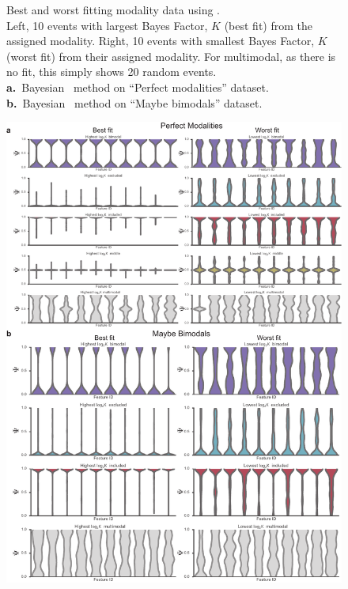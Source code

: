 \clearpage
\thispagestyle{facingcaption}
\begin{figure}[h]
\captionsetup{labelformat=prev-page}
  \caption[Best and worst fitting modality data using \anchor.]{
  Best and worst fitting modality data using \anchor.\\
Left, 10 events with largest Bayes Factor, $K$ (best fit) from the assigned modality. Right, 10 events with smallest Bayes Factor, $K$ (worst fit) from their assigned modality. For multimodal, as there is no fit, this simply shows 20 random events.\\
\textbf{a.}~Bayesian \anchor\, method on ``Perfect modalities'' dataset.\\
\textbf{b.}~Bayesian \anchor\, method on ``Maybe bimodals'' dataset.
}
\label{fig:anchor_best_worst}
\end{figure}
\clearpage
\begin{figure}[h]
\ContinuedFloat
\captionsetup{labelformat=empty}
\centering
  \includegraphics[width=5.8in]{figures/anchor_best_worst}
\end{figure}
\clearpage


